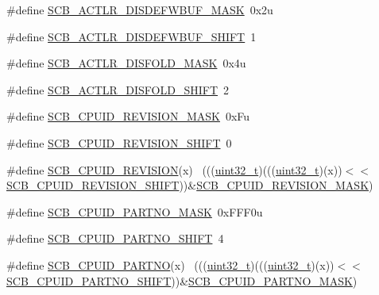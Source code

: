 \begin{DoxyCompactItemize}
\item 
\#define \hyperlink{group___s_c_b___register___masks_ga4c490bd1cf152dfc561b16ecd0c299b9}{S\+C\+B\+\_\+\+A\+C\+T\+L\+R\+\_\+\+D\+I\+S\+D\+E\+F\+W\+B\+U\+F\+\_\+\+M\+A\+SK}~0x2u
\item 
\#define \hyperlink{group___s_c_b___register___masks_gab4462053d8fad6812d5d1ac5c221bfb1}{S\+C\+B\+\_\+\+A\+C\+T\+L\+R\+\_\+\+D\+I\+S\+D\+E\+F\+W\+B\+U\+F\+\_\+\+S\+H\+I\+FT}~1
\item 
\#define \hyperlink{group___s_c_b___register___masks_gaf6db9bf675e72117781be485f701b7d0}{S\+C\+B\+\_\+\+A\+C\+T\+L\+R\+\_\+\+D\+I\+S\+F\+O\+L\+D\+\_\+\+M\+A\+SK}~0x4u
\item 
\#define \hyperlink{group___s_c_b___register___masks_gadd11de163d74ebcd19b1569980c26abc}{S\+C\+B\+\_\+\+A\+C\+T\+L\+R\+\_\+\+D\+I\+S\+F\+O\+L\+D\+\_\+\+S\+H\+I\+FT}~2
\item 
\#define \hyperlink{group___s_c_b___register___masks_ga85fcec5a1a285bf2ead09d715e7fd825}{S\+C\+B\+\_\+\+C\+P\+U\+I\+D\+\_\+\+R\+E\+V\+I\+S\+I\+O\+N\+\_\+\+M\+A\+SK}~0x\+Fu
\item 
\#define \hyperlink{group___s_c_b___register___masks_ga6c4bd208cc5af38612bf38b291f8312d}{S\+C\+B\+\_\+\+C\+P\+U\+I\+D\+\_\+\+R\+E\+V\+I\+S\+I\+O\+N\+\_\+\+S\+H\+I\+FT}~0
\item 
\#define \hyperlink{group___s_c_b___register___masks_gad84b7d9f172bb11a61e873c8316feaac}{S\+C\+B\+\_\+\+C\+P\+U\+I\+D\+\_\+\+R\+E\+V\+I\+S\+I\+ON}(x)                                    ~(((\hyperlink{_p_e___types_8h_a33594304e786b158f3fb30289278f5af}{uint32\+\_\+t})(((\hyperlink{_p_e___types_8h_a33594304e786b158f3fb30289278f5af}{uint32\+\_\+t})(x))$<$$<$\hyperlink{group___s_c_b___register___masks_ga6c4bd208cc5af38612bf38b291f8312d}{S\+C\+B\+\_\+\+C\+P\+U\+I\+D\+\_\+\+R\+E\+V\+I\+S\+I\+O\+N\+\_\+\+S\+H\+I\+FT}))\&\hyperlink{group___s_c_b___register___masks_ga85fcec5a1a285bf2ead09d715e7fd825}{S\+C\+B\+\_\+\+C\+P\+U\+I\+D\+\_\+\+R\+E\+V\+I\+S\+I\+O\+N\+\_\+\+M\+A\+SK})
\item 
\#define \hyperlink{group___s_c_b___register___masks_ga59f6aaadd9ecf7fed4e622ab8052f8d4}{S\+C\+B\+\_\+\+C\+P\+U\+I\+D\+\_\+\+P\+A\+R\+T\+N\+O\+\_\+\+M\+A\+SK}~0x\+F\+F\+F0u
\item 
\#define \hyperlink{group___s_c_b___register___masks_gac28acf4ce5242a53961b9549e7dd0115}{S\+C\+B\+\_\+\+C\+P\+U\+I\+D\+\_\+\+P\+A\+R\+T\+N\+O\+\_\+\+S\+H\+I\+FT}~4
\item 
\#define \hyperlink{group___s_c_b___register___masks_gafa3a6f28ced4e51aab9188686cc87434}{S\+C\+B\+\_\+\+C\+P\+U\+I\+D\+\_\+\+P\+A\+R\+T\+NO}(x)                                        ~(((\hyperlink{_p_e___types_8h_a33594304e786b158f3fb30289278f5af}{uint32\+\_\+t})(((\hyperlink{_p_e___types_8h_a33594304e786b158f3fb30289278f5af}{uint32\+\_\+t})(x))$<$$<$\hyperlink{group___s_c_b___register___masks_gac28acf4ce5242a53961b9549e7dd0115}{S\+C\+B\+\_\+\+C\+P\+U\+I\+D\+\_\+\+P\+A\+R\+T\+N\+O\+\_\+\+S\+H\+I\+FT}))\&\hyperlink{group___s_c_b___register___masks_ga59f6aaadd9ecf7fed4e622ab8052f8d4}{S\+C\+B\+\_\+\+C\+P\+U\+I\+D\+\_\+\+P\+A\+R\+T\+N\+O\+\_\+\+M\+A\+SK})

\end{DoxyCompactItemize}

